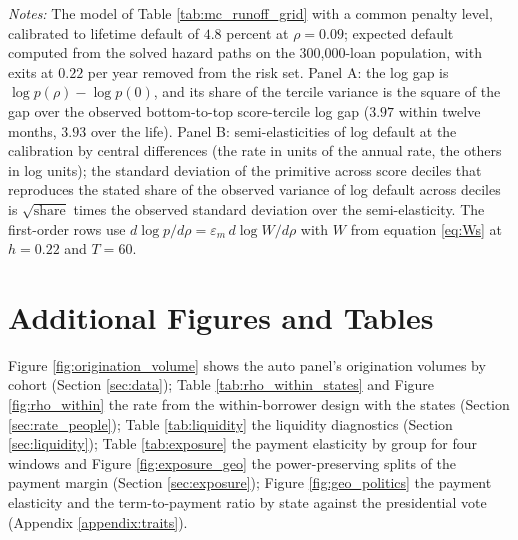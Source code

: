 \documentclass[12pt,english]{article}
\begin{document}
\begin{table}[H]
\centering
\caption{The variation in the discount rate, and in the other primitives, that would reproduce the observed variation in default across score groups}
\label{tab:rho_variance}
\scriptsize
\resizebox{\textwidth}{!}{}
\vspace{0.5em}
\begin{minipage}{0.95\textwidth}
\noindent \small \textit{Notes:} The model of Table \ref{tab:mc_runoff_grid} with a common penalty level, calibrated to lifetime default of $4.8$ percent at $\rho = 0.09$; expected default computed from the solved hazard paths on the 300,000-loan population, with exits at $0.22$ per year removed from the risk set. Panel A: the log gap is $\log p(\rho) - \log p(0)$, and its share of the tercile variance is the square of the gap over the observed bottom-to-top score-tercile log gap ($3.97$ within twelve months, $3.93$ over the life). Panel B: semi-elasticities of log default at the calibration by central differences (the rate in units of the annual rate, the others in log units); the standard deviation of the primitive across score deciles that reproduces the stated share of the observed variance of log default across deciles is $\sqrt{\text{share}}$ times the observed standard deviation over the semi-elasticity. The first-order rows use $d\log p/d\rho = \varepsilon_m\,d\log W/d\rho$ with $W$ from equation \eqref{eq:Ws} at $h = 0.22$ and $T = 60$.
\end{minipage}
\end{table}









\section{Additional Figures and Tables}\label{appendix:figures}

Figure \ref{fig:origination_volume} shows the auto panel's origination volumes by cohort (Section \ref{sec:data}); Table \ref{tab:rho_within_states} and Figure \ref{fig:rho_within} the rate from the within-borrower design with the states (Section \ref{sec:rate_people}); Table \ref{tab:liquidity} the liquidity diagnostics (Section \ref{sec:liquidity}); Table \ref{tab:exposure} the payment elasticity by group for four windows and Figure \ref{fig:exposure_geo} the power-preserving splits of the payment margin (Section \ref{sec:exposure}); Figure \ref{fig:geo_politics} the payment elasticity and the term-to-payment ratio by state against the presidential vote (Appendix \ref{appendix:traits}).
\end{document}
